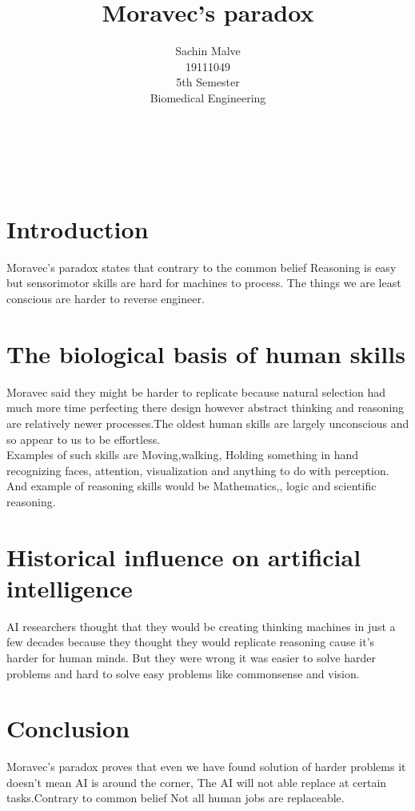 \documentclass{article}
\begin{document}
\title{\vspace{-5cm}Moravec's paradox}
\author{Sachin Malve \\
	19111049 \\
 	5th Semester \\ 
	Biomedical Engineering\\
	}
\maketitle 
 \hrulefill
 \\
 \\
 
\section{Introduction}
 Moravec's paradox states that contrary to the common belief Reasoning is easy but sensorimotor skills are hard for machines to process. The things we are least conscious are harder to reverse engineer. \\
  
\section{The biological basis of human skills}
Moravec said they might be harder to replicate because natural selection had much more time perfecting there design however abstract thinking and reasoning are relatively newer processes.The oldest human skills are largely unconscious and so appear to us to be effortless.\\
Examples of such skills are Moving,walking, Holding something in hand recognizing faces, attention, visualization and anything to do with perception. And example of reasoning skills would be Mathematics,, logic and scientific reasoning. \\

\section{Historical influence on artificial intelligence}
AI researchers thought that they would be creating thinking machines in just a few decades because they thought they would replicate reasoning cause it's harder for human minds. But they were wrong it was easier to solve harder problems and hard to solve easy problems like commonsense and vision.\\

\section{Conclusion} 
 Moravec's paradox proves that even we have found solution of harder problems it doesn't mean AI is around the corner, The AI will not able replace at certain tasks.Contrary to common belief Not all human jobs are replaceable.
 
 
 
 
 
 
 
 
 
 
 
 
 
\end{document}
